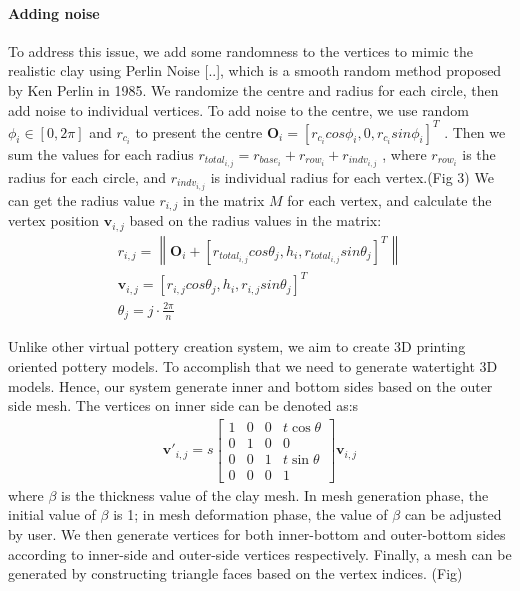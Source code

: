 \paragraph{Adding noise} To address this issue, we add some randomness to the vertices to mimic the realistic clay using Perlin Noise [..], which is a smooth random method proposed by Ken Perlin in 1985. We randomize the centre and radius for each circle, then add noise to individual vertices.
To add noise to the centre, we use random $\phi_{i} \in [0, 2\pi]$ and $r_{c_{i}}$ to present the centre
$\mathbf{O}_{i} = \left[r_{c_{i}}cos\phi_{i}, 0, r_{c_{i}}sin\phi_{i}\right]^T$
. Then we sum the values for each radius
$r_{total_{i,j}} = r_{base_{i}} + r_{row_{i}} + r_{indv_{i,j}}$
, where $r_{row_{i}}$ is the radius for each circle, and $r_{indv_{i,j}}$ is individual radius for each vertex.(Fig 3) We can get the radius value $r_{i,j}$ in the matrix $M$ for each vertex, and calculate the vertex position $\mathbf{v}_{i,j}$ based on the radius values in the matrix:
\begin{equation}
\begin{split}
r_{i,j} = \left\|
\mathbf{O}_{i} + \left[ r_{total_{i,j}} cos \theta_{j},
h_{i},
r_{total_{i,j}} sin \theta_{j}
\right]^T
\right\| \\
\mathbf{v}_{i,j} =
\left[r_{i,j}  cos \theta_{j},
h_{i},
r_{i,j} sin \theta_{j}\right]^T \\
\theta_{j} = j \cdot \frac{2\pi}{n}
\end{split}
\end{equation}

Unlike other virtual pottery creation system, we aim to create 3D printing oriented pottery models. To accomplish that we need to generate watertight 3D models. Hence, our system generate inner and bottom sides based on the outer side mesh. The vertices on inner side can be denoted as:s
\begin{equation}
\begin{split}
\mathbf{v'}_{i,j} = s
\begin{bmatrix}
1 & 0 & 0 & t\cos\theta \\
0 & 1 & 0 & 0\\ 
0 & 0 & 1 & t\sin\theta \\
0 & 0 & 0 & 1 
\end{bmatrix}
\mathbf{v}_{i,j}
\end{split}
\end{equation}
where $\beta$ is the thickness value of the clay mesh. In mesh generation phase, the initial value of $\beta$ is 1; in mesh deformation phase, the value of $\beta$ can be adjusted by user.
We then generate vertices for both inner-bottom and outer-bottom sides according to inner-side and outer-side vertices respectively. Finally, a mesh can be generated by constructing triangle faces based on the vertex indices. (Fig)

